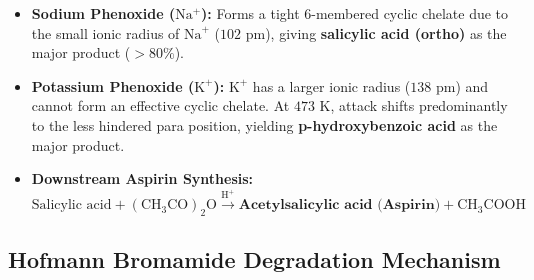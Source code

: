 \documentclass[10pt,a4paper]{article}
\begin{document}
\begin{ncertbox}
\begin{itemize}
  \item \textbf{Sodium Phenoxide ($\mathrm{Na^+}$):} Forms a tight 6-membered cyclic chelate due to the small ionic radius of $\mathrm{Na}^+$ ($102\text{ pm}$), giving \textbf{salicylic acid (ortho)} as the major product ($> 80\%$).
  \item \textbf{Potassium Phenoxide ($\mathrm{K^+}$):} $\mathrm{K}^+$ has a larger ionic radius ($138\text{ pm}$) and cannot form an effective cyclic chelate. At $473\text{ K}$, attack shifts predominantly to the less hindered para position, yielding \textbf{p-hydroxybenzoic acid} as the major product.
  \item \textbf{Downstream Aspirin Synthesis:}
  \begin{equation}
    \text{Salicylic acid} + (\mathrm{CH_3CO})_2\mathrm{O} \xrightarrow{\mathrm{H^+}} \textbf{Acetylsalicylic acid (Aspirin)} + \mathrm{CH_3COOH}
  \end{equation}
\end{itemize}
\end{ncertbox}

\subsection{Hofmann Bromamide Degradation Mechanism}
\end{document}
